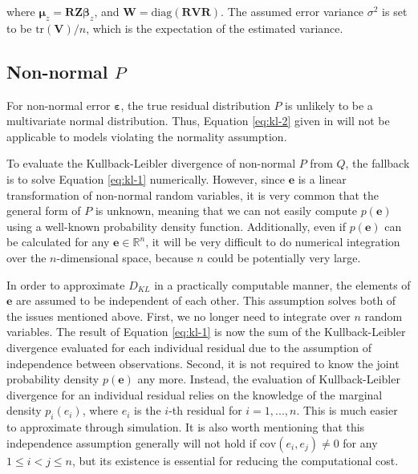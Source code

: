 \documentclass[]{interact}
\theoremstyle{plain}%
\theoremstyle{definition}
\theoremstyle{remark}
\begin{document}
\noindent where
\(\boldsymbol{\mu}_z = \boldsymbol{R}\boldsymbol{Z}\boldsymbol{\beta}_z\),
and
\(\boldsymbol{W} = \text{diag}(\boldsymbol{R}\boldsymbol{V}\boldsymbol{R})\).
The assumed error variance \(\sigma^2\) is set to be
\(\text{tr}(\boldsymbol{V})/n\), which is the expectation of the
estimated variance.

\subsection{\texorpdfstring{Non-normal
\(P\)}{Non-normal P}}\label{non-normal-p}

For non-normal error \(\boldsymbol{\varepsilon}\), the true residual
distribution \(P\) is unlikely to be a multivariate normal distribution.
Thus, Equation \ref{eq:kl-2} given in \citet{li2024plot} will not be
applicable to models violating the normality assumption.

To evaluate the Kullback-Leibler divergence of non-normal \(P\) from
\(Q\), the fallback is to solve Equation \ref{eq:kl-1} numerically.
However, since \(\boldsymbol{e}\) is a linear transformation of
non-normal random variables, it is very common that the general form of
\(P\) is unknown, meaning that we can not easily compute
\(p(\boldsymbol{e})\) using a well-known probability density function.
Additionally, even if \(p(\boldsymbol{e})\) can be calculated for any
\(\boldsymbol{e} \in \mathbb{R}^n\), it will be very difficult to do
numerical integration over the \(n\)-dimensional space, because \(n\)
could be potentially very large.

In order to approximate \(D_{KL}\) in a practically computable manner,
the elements of \(\boldsymbol{e}\) are assumed to be independent of each
other. This assumption solves both of the issues mentioned above. First,
we no longer need to integrate over \(n\) random variables. The result
of Equation \ref{eq:kl-1} is now the sum of the Kullback-Leibler
divergence evaluated for each individual residual due to the assumption
of independence between observations. Second, it is not required to know
the joint probability density \(p(\boldsymbol{e})\) any more. Instead,
the evaluation of Kullback-Leibler divergence for an individual residual
relies on the knowledge of the marginal density \(p_i(e_i)\), where
\(e_i\) is the \(i\)-th residual for \(i = 1, ..., n\). This is much
easier to approximate through simulation. It is also worth mentioning
that this independence assumption generally will not hold if
\(\text{cov}(e_i, e_j) \neq 0\) for any \(1 \leq i < j \leq n\), but its
existence is essential for reducing the computational cost.
\end{document}
